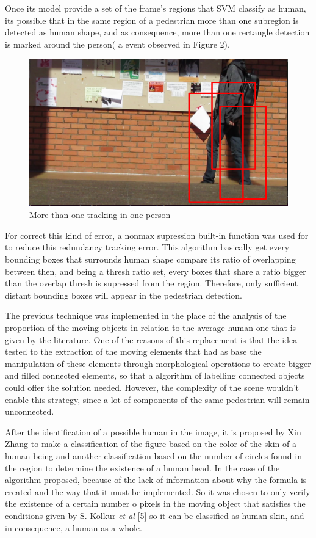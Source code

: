 \documentclass[conference]{IEEEtran}
\begin{document}
	Once its model provide a set of the frame's regions that SVM classify as human, its possible that in the same region of a pedestrian more than one subregion is detected as human shape, and as consequence, more than one rectangle detection is marked around the person( a event observed in Figure 2).
	
	\begin{figure}[htbp]
	\centerline{\includegraphics[scale=0.5]{Non_max.png}}
	\caption{More than one tracking in one person}
	\label{fig}
	\end{figure}
	
	For correct this kind of error, a nonmax supression built-in function was used for to reduce this redundancy tracking error. This algorithm basically get every bounding boxes that surrounds human shape compare its ratio of overlapping between then, and being a thresh ratio set, every boxes that share a ratio bigger than the overlap thresh is supressed from the region. Therefore, only sufficient distant bounding boxes will appear in the pedestrian detection.
	
	The previous technique was implemented in the place of the analysis of the proportion of the moving objects in relation to the average human one that is given by the literature. One of the reasons of this replacement is that the idea tested to the extraction of the moving elements that had as base the manipulation of these elements through morphological operations to create bigger and filled connected elements, so that a algorithm of labelling connected objects could offer the solution needed. However, the complexity of the scene wouldn't enable this strategy, since a lot of components of the same pedestrian will remain unconnected.
	
	After the identification of a possible human in the image, it is proposed by Xin Zhang
to make a classification of the figure based on the color of the skin of a human being and another classification based on the number of circles found in the region to determine the existence of a human head. In the case of the algorithm proposed, because of the lack of information about why the formula is created and the way that it must be implemented. So it was chosen to only verify the existence of a certain number o pixels in the moving object that satisfies the conditions given by S. Kolkur \textit{et al} [5] so it can be classified as human skin, and in consequence, a human as a whole.
	
\end{document}
